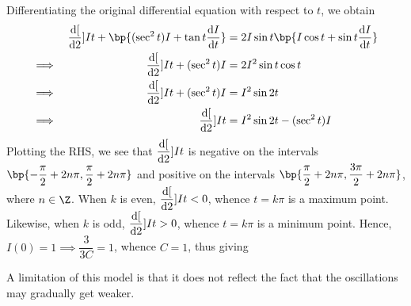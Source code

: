 \documentclass{echw}
\begin{document}
        Differentiating the original differential equation with respect to $t$, we obtain
        \begin{alignat*}{2}
            && \der[2]{I}{t} + \bp{(\sec^2 t) I + \tan t \der{I}{t}} &= 2 I \sin t \bp{I \cos t + \sin t \der{I}{t}}\\
            \implies&&\der[2]{I}{t} + (\sec^2 t) I &= 2 I^2 \sin t \cos t\\
            \implies&&\der[2]{I}{t} + (\sec^2 t) I &= I^2 \sin 2t\\
            \implies&&\der[2]{I}{t} &= I^2 \sin 2t - (\sec^2 t) I\\
        \end{alignat*}
        Plotting the RHS, we see that $\dfrac{\mathrm{d} [}{\mathrm{d} 2}]{I}{t}$ is negative on the intervals $\bp{-\dfrac\pi2 + 2n\pi, \dfrac\pi2 + 2n\pi}$ and positive on the intervals $\bp{\dfrac\pi2 + 2n\pi, \dfrac{3\pi}2 + 2n\pi}$, where $n \in \Z$. When $k$ is even, $\dfrac{\mathrm{d} [}{\mathrm{d} 2}]{I}{t} < 0$, whence $t = k\pi$ is a maximum point. Likewise, when $k$ is odd, $\dfrac{\mathrm{d} [}{\mathrm{d} 2}]{I}{t} > 0$, whence $t = k\pi$ is a minimum point. Hence, $I(0) = 1 \implies \dfrac{3}{3C} = 1$, whence $C = 1$, thus giving

        A limitation of this model is that it does not reflect the fact that the oscillations may gradually get weaker.
\end{document}
